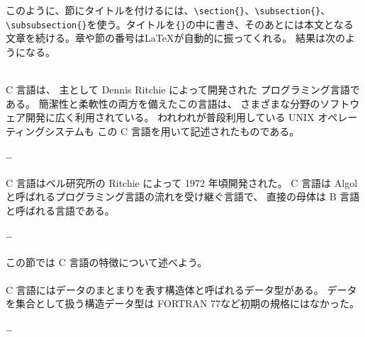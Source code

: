 このように、節にタイトルを付けるには、\verb|\section{}|、\verb|\subsection{}|、\verb|\subsubsection{}|を使う。タイトルを\verb|{}|の中に書き、そのあとには本文となる文章を続ける。章や節の番号は\LaTeX が自動的に振ってくれる。
結果は次のようになる。
\begin{kekka}
     \\[.2em]

    C 言語は、
    主として Dennis Ritchie によって開発された
    プログラミング言語である。
    簡潔性と柔軟性の両方を備えたこの言語は、
    さまざまな分野のソフトウェア開発に広く利用されている。
    われわれが普段利用している UNIX オペレーティングシステムも
    この C 言語を用いて記述されたものである。

    \dots \\[.2em]

     \\[.2em]

    C 言語はベル研究所の Ritchie によって 1972 年頃開発された。
    C 言語は Algol と呼ばれるプログラミング言語の流れを受け継ぐ言語で、
    直接の母体は B 言語と呼ばれる言語である。

    \dots \\[.2em]

     \\[.2em]

    この節では C 言語の特徴について述べよう。 \\[.2em]

     \\[.2em]

    C 言語にはデータのまとまりを表す構造体と呼ばれるデータ型がある。
    データを集合として扱う構造データ型は FORTRAN 77など初期の規格にはなかった。

    \dots \\[.2em]

     \\[.2em]


\end{kekka}
